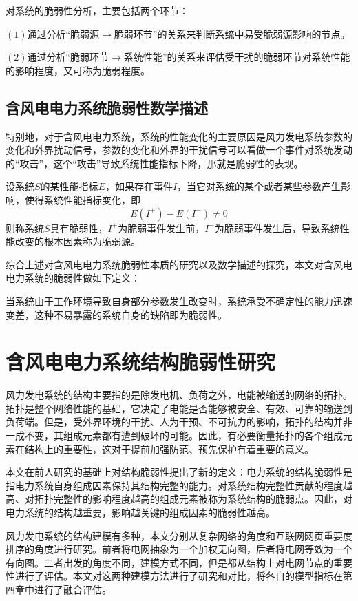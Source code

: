 对系统的脆弱性分析，主要包括两个环节：

$(1)$通过分析“脆弱源$\longrightarrow$脆弱环节”的关系来判断系统中易受脆弱源影响的节点。

$(2)$通过分析“脆弱环节$\longrightarrow$系统性能”的关系来评估受干扰的脆弱环节对系统性能的影响程度，又可称为脆弱程度。

\subsection{含风电电力系统脆弱性数学描述}
\label{sec:network}
特别地，对于含风电电力系统，系统的性能变化的主要原因是风力发电系统参数的变化和外界扰动信号，参数的变化和外界的干扰信号可以看做一个事件对系统发动的“攻击”，这个“攻击”导致系统性能指标下降，那就是脆弱性的表现。

设系统$S$的某性能指标$E$，如果存在事件$I$，当它对系统的某个或者某些参数产生影响，使得系统性能指标变化，即
\begin{equation}
\label{equ:chap3:Index0}
E(I^{+})-E(I^{-})\neq 0
\end{equation}
则称系统$S$具有脆弱性，$I^{+}$为脆弱事件发生前，$I^{-}$为脆弱事件发生后，导致系统性能改变的根本因素称为脆弱源。

综合上述对含风电电力系统脆弱性本质的研究以及数学描述的探究，本文对含风电电力系统的脆弱性做如下定义：

当系统由于工作环境导致自身部分参数发生改变时，系统承受不确定性的能力迅速变差，这种不易暴露的系统自身的缺陷即为脆弱性。

\section{含风电电力系统结构脆弱性研究}
\label{sec:powersys}
风力发电系统的结构主要指的是除发电机、负荷之外，电能被输送的网络的拓扑。拓扑是整个网络性能的基础，它决定了电能是否能够被安全、有效、可靠的输送到负荷端。但是，受外界环境的干扰、人为干预、不可抗力的影响，拓扑的结构并非一成不变，其组成元素都有遭到破坏的可能。因此，有必要衡量拓扑的各个组成元素在结构上的重要性，这对于提前加强防范、预先保护有着重要的意义。

本文在前人研究的基础上对结构脆弱性提出了新的定义：电力系统的结构脆弱性是指电力系统自身组成因素保持其结构完整的能力。对系统结构完整性贡献的程度越高、对拓扑完整性的影响程度越高的组成元素被称为系统结构的脆弱点。因此，对电力系统的结构越重要，影响越关键的组成因素的脆弱性越高。

风力发电系统的结构建模有多种，本文分别从复杂网络的角度和互联网网页重要度排序的角度进行研究。前者将电网抽象为一个加权无向图，后者将电网等效为一个有向图。二者出发的角度不同，建模方式不同，但是都从结构上对电网节点的重要性进行了评估。本文对这两种建模方法进行了研究和对比，将各自的模型指标在第四章中进行了融合评估。

